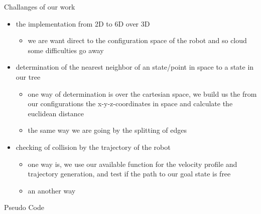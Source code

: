 \documentclass[%
  professionalfonts,%
  xcolor={%
    usenames,%
    dvipsnames,%
    svgnames,%
    table,%
    hyperref%
  }%
]{beamer}
\begin{document}
      \begin{frame}{Challanges of our work}
        \begin{itemize}
          \item the implementation from 2D to 6D over 3D
          \begin{itemize}
            \item we are want direct to the configuration space of the robot and so cloud some difficulties go away
          \end{itemize}
          \item determination of the nearest neighbor of an state/point in space to a state in our tree
          \begin{itemize}
            \item one way of determination is over the cartesian space, we build us the from our configurations the x-y-z-coordinates in space and calculate the euclidean distance
            \item the same way we are going by the splitting of edges
          \end{itemize}
          \item checking of collision by the trajectory of the robot
          \begin{itemize}
            \item one way is, we use our available function for the velocity profile and trajectory generation, and test if the path to our goal state is free 
            \item an another way
          \end{itemize}
        \end{itemize}
      \end{frame}
      
      \begin{frame}{Pseudo Code}
        
      \end{frame}
      
      
\end{document}
